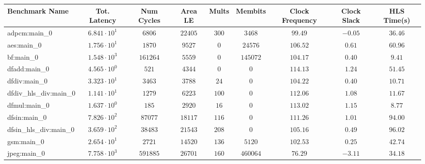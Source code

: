 \begin{tabular}{|l|c|c|c|c|c|c|c|c|}
\hline
Benchmark Name          & Tot. Latency           & Num Cycles  & Area LE    & Mults    & Membits    & Clock Frequency & Clock Slack & HLS Time(s) \\
\hline
adpcm:main\_0           & $ 6.841 \cdot 10^{1} $ & $ 6806    $ & $ 22405  $ & $ 300  $ & $ 3468   $ & $ 99.49       $ & $ -0.05   $ & $ 36.46   $ \\
aes:main\_0             & $ 1.756 \cdot 10^{1} $ & $ 1870    $ & $ 9527   $ & $ 0    $ & $ 24576  $ & $ 106.52      $ & $ 0.61    $ & $ 60.96   $ \\
bf:main\_0              & $ 1.548 \cdot 10^{3} $ & $ 161264  $ & $ 5559   $ & $ 0    $ & $ 145072 $ & $ 104.17      $ & $ 0.40    $ & $ 9.41    $ \\
dfadd:main\_0           & $ 4.565 \cdot 10^{0} $ & $ 521     $ & $ 4344   $ & $ 0    $ & $ 0      $ & $ 114.13      $ & $ 1.24    $ & $ 51.45   $ \\
dfdiv:main\_0           & $ 3.323 \cdot 10^{1} $ & $ 3463    $ & $ 3788   $ & $ 24   $ & $ 0      $ & $ 104.22      $ & $ 0.40    $ & $ 10.71   $ \\
dfdiv\_hls\_div:main\_0 & $ 1.141 \cdot 10^{1} $ & $ 1279    $ & $ 6223   $ & $ 100  $ & $ 0      $ & $ 112.06      $ & $ 1.08    $ & $ 11.67   $ \\
dfmul:main\_0           & $ 1.637 \cdot 10^{0} $ & $ 185     $ & $ 2920   $ & $ 16   $ & $ 0      $ & $ 113.02      $ & $ 1.15    $ & $ 8.77    $ \\
dfsin:main\_0           & $ 7.826 \cdot 10^{2} $ & $ 87077   $ & $ 18117  $ & $ 116  $ & $ 0      $ & $ 111.26      $ & $ 1.01    $ & $ 94.00   $ \\
dfsin\_hls\_div:main\_0 & $ 3.659 \cdot 10^{2} $ & $ 38483   $ & $ 21543  $ & $ 208  $ & $ 0      $ & $ 105.16      $ & $ 0.49    $ & $ 96.02   $ \\
gsm:main\_0             & $ 2.654 \cdot 10^{1} $ & $ 2721    $ & $ 14520  $ & $ 136  $ & $ 5120   $ & $ 102.53      $ & $ 0.25    $ & $ 42.74   $ \\
jpeg:main\_0            & $ 7.758 \cdot 10^{3} $ & $ 591885  $ & $ 26701  $ & $ 160  $ & $ 460064 $ & $ 76.29       $ & $ -3.11   $ & $ 34.18   $ \\

\end{tabular}
